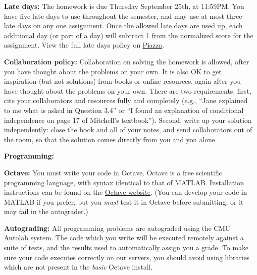 \documentclass{article}
\begin{document}
\begin{itemize*}


\item \textbf{Late days:} The homework is due Thursday September 25th, at 11:59PM. You have five late days to use throughout the semester, and may use at most three late days on any one assignment. Once the allowed late days are used up, each additional day (or part of a day) will subtract 1 from the normalized score for the assignment. View the full late days policy on \href{https://piazza.com/class/hxwaa1bxuze4xj?cid=10}{Piazza}.

\item \textbf{Collaboration policy:} Collaboration on solving the homework is allowed, after you have thought about the problems on your own.  It is also OK to get inspiration (but not solutions) from books or online resources, again after you have thought about the problems on your own.  There are two requirements: first, cite your collaborators and resources fully and completely (e.g., ``Jane explained to me what is asked in Question 3.4'' or ``I found an explanation of conditional independence on page 17 of Mitchell's textbook'').  Second, write up your solution independently: close the book and all of your notes, and send collaborators out of the room, so that the solution comes directly from you and you alone.

\item \textbf{Programming:} 
\begin{itemize*}
\item \textbf{Octave:} You must write your code in Octave. Octave is a free scientific programming language, with syntax identical to that of MATLAB. Installation instructions can be found on the \href{http://www.gnu.org/software/octave/}{Octave website}. (You can develop your code in MATLAB if you prefer, but you \emph{must} test it in Octave before submitting, or it may fail in the autograder.)
\item \textbf{Autograding:} All programming problems are autograded using the CMU Autolab system. The code which you write will be executed remotely against a suite of tests, and the results used to automatically assign you a grade. To make sure your code executes correctly on our servers, you should avoid using libraries which are not present in the \emph{basic} Octave install.
\end{itemize*}


\end{itemize*}
\end{document}
